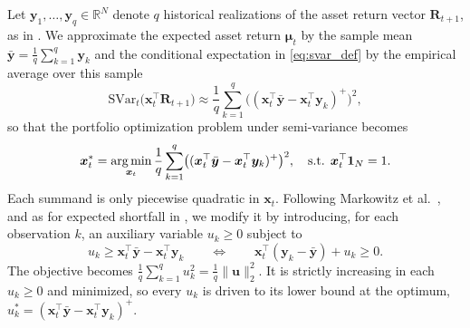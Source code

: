 Let $\bm{y}_1, \dots, \bm{y}_q \in \mathbb{R}^N$ denote $q$ historical realizations of the asset return vector
$\bm{R}_{t+1}$, as in . We approximate the expected asset return $\bm{\mu}_t$ by the sample mean
$\bar{\bm{y}} = \frac{1}{q} \sum_{k=1}^q \bm{y}_k$ and the conditional expectation in \eqref{eq:svar_def} by the
empirical average over this sample
\begin{equation*}
    \text{SVar}_t\bigl( \bm{x}_t^\top \bm{R}_{t+1} \bigr)
    \approx \frac{1}{q} \sum_{k=1}^q \bigl( (\bm{x}_t^\top \bar{\bm{y}} - \bm{x}_t^\top \bm{y}_k)^+ \bigr)^2,
\end{equation*}
so that the portfolio optimization problem under semi-variance becomes
\begin{equation} \label{eq:empirical_svar}
    \bm{x}_t^* = \operatorname*{arg\,min}_{\bm{x}_t} \frac{1}{q} \sum_{k=1}^q \bigl( (\bm{x}_t^\top \bar{\bm{y}} - \bm{x}_t^\top \bm{y}_k)^+ \bigr)^2,
    \quad \text{s.t. } \bm{x}_t^\top \bm{1}_N = 1.
\end{equation}
Each summand is only piecewise quadratic in $\bm{x}_t$. Following Markowitz et al.~\cite{Markowitz1993}, and as for expected shortfall in ,
we modify it by introducing, for each observation $k$, an auxiliary variable
$u_k \ge 0$ subject to
\begin{equation} \label{eq:svar_slack}
    u_k \ge \bm{x}_t^\top \bar{\bm{y}} - \bm{x}_t^\top \bm{y}_k 
    \qquad \Longleftrightarrow \qquad
    \bm{x}_t^\top (\bm{y}_k - \bar{\bm{y}}) + u_k \ge 0.
\end{equation}
The objective becomes $\frac{1}{q} \sum_{k=1}^q u_k^2 = \frac{1}{q}
\|\bm{u}\|_2^2$. It is strictly increasing in each $u_k \ge 0$ and minimized, so every $u_k$ is driven to its lower
bound at the optimum, $u_k^* = (\bm{x}_t^\top \bar{\bm{y}} - \bm{x}_t^\top \bm{y}_k)^+$.

